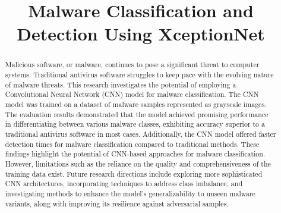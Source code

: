 \documentclass[conference]{IEEEtran}
\begin{document}
\title{Malware Classification and Detection Using XceptionNet}

\author{
\and
{}
\and
{}
\and
{}

\and
{}

}


\maketitle

\begin{abstract}
Malicious software, or malware, continues to pose a significant threat to computer systems. Traditional antivirus software struggles to keep pace with the evolving nature of malware threats. This research investigates the potential of employing a Convolutional Neural Network (CNN) model for malware classification. The CNN model was trained on a dataset of malware samples represented as grayscale images. The evaluation results demonstrated that the model achieved promising performance in differentiating between various malware classes, exhibiting accuracy superior to a traditional antivirus software in most cases. Additionally, the CNN model offered faster detection times for malware classification compared to traditional methods. These findings highlight the potential of CNN-based approaches for malware classification. However, limitations such as the reliance on the quality and comprehensiveness of the training data exist. Future research directions include exploring more sophisticated CNN architectures, incorporating techniques to address class imbalance, and investigating methods to enhance the model's generalizability to unseen malware variants, along with improving its resilience against adversarial samples.
\end{abstract}
\end{document}
